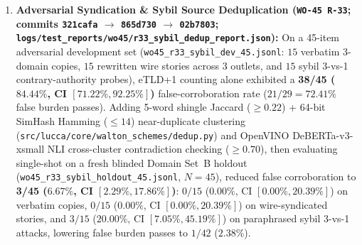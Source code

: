 \documentclass[11pt,a4paper]{article}
\begin{document}
\begin{enumerate}
    \item \textbf{Adversarial Syndication \& Sybil Source Deduplication (\texttt{WO-45 R-33}; commits \texttt{321cafa} $\rightarrow$ \texttt{865d730} $\rightarrow$ \texttt{02b7803}; \texttt{logs/test\_reports/wo45/r33\_sybil\_dedup\_report.json}):} On a 45-item adversarial development set (\texttt{wo45\_r33\_sybil\_dev\_45.jsonl}: $15$ verbatim 3-domain copies, $15$ rewritten wire stories across 3 outlets, and $15$ sybil 3-vs-1 contrary-authority probes), eTLD+1 counting alone exhibited a \textbf{38/45 ($84.44\%$, CI $[71.22\%, 92.25\%]$)} false-corroboration rate ($21/29 = 72.41\%$ false burden passes). Adding 5-word shingle Jaccard ($\ge 0.22$) + 64-bit SimHash Hamming ($\le 14$) near-duplicate clustering (\texttt{src/lucca/core/walton\_schemes/dedup.py}) and OpenVINO DeBERTa-v3-xsmall NLI cross-cluster contradiction checking ($\ge 0.70$), then evaluating single-shot on a fresh blinded Domain Set~B holdout (\texttt{wo45\_r33\_sybil\_holdout\_45.jsonl}, $N=45$), reduced false corroboration to \textbf{3/45 ($6.67\%$, CI $[2.29\%, 17.86\%]$)}: $0/15$ ($0.00\%$, CI $[0.00\%, 20.39\%]$) on verbatim copies, $0/15$ ($0.00\%$, CI $[0.00\%, 20.39\%]$) on wire-syndicated stories, and $3/15$ ($20.00\%$, CI $[7.05\%, 45.19\%]$) on paraphrased sybil 3-vs-1 attacks, lowering false burden passes to $1/42$ ($2.38\%$).

\end{enumerate}
\end{document}
